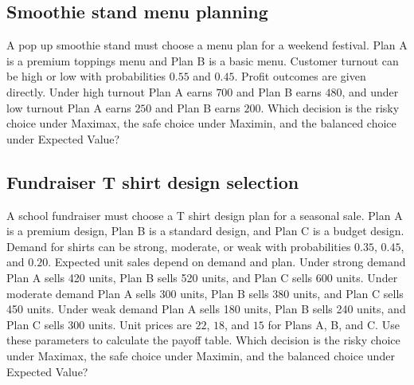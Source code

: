 	\begin{ExamProblems}
		\item
		\subsection*{Smoothie stand menu planning}
		A pop up smoothie stand must choose a menu plan for a weekend festival. Plan A is a premium toppings menu and Plan B is a basic menu. Customer turnout can be high or low with probabilities $0.55$ and $0.45$. Profit outcomes are given directly. Under high turnout Plan A earns $700$ and Plan B earns $480$, and under low turnout Plan A earns $250$ and Plan B earns $200$. Which decision is the risky choice under Maximax, the safe choice under Maximin, and the balanced choice under Expected Value?

		\item
		\subsection*{Fundraiser T shirt design selection}
		A school fundraiser must choose a T shirt design plan for a seasonal sale. Plan A is a premium design, Plan B is a standard design, and Plan C is a budget design. Demand for shirts can be strong, moderate, or weak with probabilities $0.35$, $0.45$, and $0.20$. Expected unit sales depend on demand and plan. Under strong demand Plan A sells 420 units, Plan B sells 520 units, and Plan C sells 600 units. Under moderate demand Plan A sells 300 units, Plan B sells 380 units, and Plan C sells 450 units. Under weak demand Plan A sells 180 units, Plan B sells 240 units, and Plan C sells 300 units. Unit prices are $22$, $18$, and $15$ for Plans A, B, and C. Use these parameters to calculate the payoff table. Which decision is the risky choice under Maximax, the safe choice under Maximin, and the balanced choice under Expected Value?

		\item

\end{ExamProblems}
